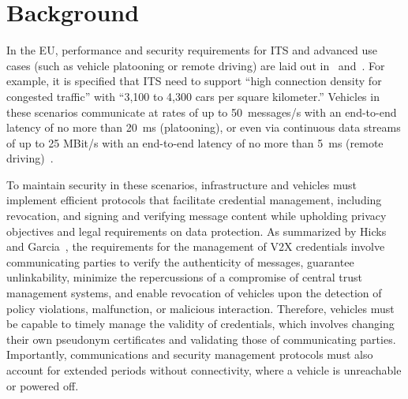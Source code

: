 \section{Background}
\label{chapter:background}

\label{background:v2x}

In the EU, performance and security requirements for \ac{ITS} and advanced use
cases (such as vehicle platooning or remote driving) are laid out
in~\cite{etsi20171331851400} and~\cite{etsi2020ts1221861620}. For example, it is
specified that \ac{ITS} need to support ``high connection density for congested
traffic'' with ``3,100 to 4,300 cars per square kilometer.'' Vehicles in these
scenarios communicate at rates of up to 50~messages/s with an end-to-end latency
of no more than 20~ms (platooning), or even via continuous data streams of up to
25 MBit/s with an end-to-end latency of no more than 5~ms (remote
driving)~\cite{etsi2020ts1221861620}.

To maintain security in these scenarios, infrastructure and vehicles must
implement efficient protocols that facilitate credential management, including
revocation, and signing and verifying message content while upholding privacy
objectives and legal requirements on data protection. As summarized by Hicks and
Garcia~\cite{hicks2020vehicular}, the requirements for the management of
\ac{V2X} credentials involve %
communicating parties to verify the
authenticity of messages, guarantee unlinkability, minimize the repercussions of
a compromise of central trust management systems, and enable revocation of
vehicles upon the detection of policy violations, malfunction, or malicious
interaction. Therefore, vehicles must be capable to timely manage the validity
of credentials, which involves changing their own pseudonym certificates and
validating those of communicating parties. Importantly, communications and
security management protocols must also account for extended periods without
connectivity, where a vehicle is unreachable or powered off.

